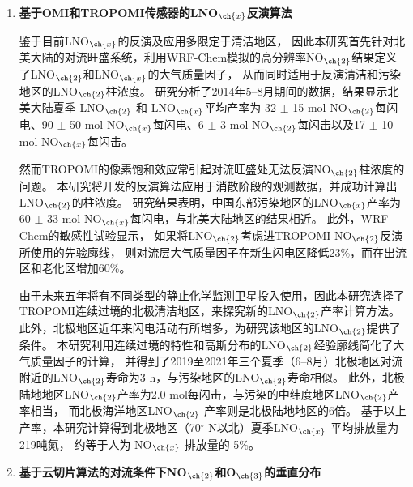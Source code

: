 \begin{enumerate}[label=（\arabic*）, labelindent=\parindent, nosep, leftmargin=0pt, widest=0, itemindent=*, topsep=0pt, partopsep=0pt, parsep=0pt]

\item \textbf{基于OMI和TROPOMI传感器的LNO$_{\ch{x}}$反演算法}

\hspace{4ex} 鉴于目前LNO$_{\ch{x}}$的反演及应用多限定于清洁地区，
因此本研究首先针对北美大陆的对流旺盛系统，利用WRF-Chem模拟的高分辨率NO$_{\ch{2}}$结果定义了LNO$_{\ch{2}}$和LNO$_{\ch{x}}$的大气质量因子，
从而同时适用于反演清洁和污染地区的LNO$_{\ch{2}}$柱浓度。
研究分析了2014年5--8月期间的数据，结果显示北美大陆夏季 LNO$_{\ch{2}}$ 和 LNO$_{\ch{x}}$平均产率为
32 $\pm$ 15 mol NO$_{\ch{2}}$每闪电、90 $\pm$ 50 mol NO$_{\ch{x}}$每闪电、6 $\pm$ 3 mol NO$_{\ch{2}}$每闪击以及17 $\pm$ 10 mol NO$_{\ch{x}}$每闪击。

\hspace{4ex} 然而TROPOMI的像素饱和效应常引起对流旺盛处无法反演NO$_{\ch{2}}$柱浓度的问题。
本研究将开发的反演算法应用于消散阶段的观测数据，并成功计算出LNO$_{\ch{2}}$的柱浓度。
研究结果表明，中国东部污染地区的LNO$_{\ch{x}}$产率为 60 $\pm$ 33 mol NO$_{\ch{x}}$每闪电，与北美大陆地区的结果相近。
此外，WRF-Chem的敏感性试验显示，
如果将LNO$_{\ch{2}}$考虑进TROPOMI NO$_{\ch{2}}$反演所使用的先验廓线，
则对流层大气质量因子在新生闪电区降低23\%，而在出流区和老化区增加60\%。

\hspace{4ex} 由于未来五年将有不同类型的静止化学监测卫星投入使用，因此本研究选择了TROPOMI连续过境的北极清洁地区，来探究新的LNO$_{\ch{2}}$产率计算方法。
此外，北极地区近年来闪电活动有所增多，为研究该地区的LNO$_{\ch{2}}$提供了条件。
本研究利用连续过境的特性和高斯分布的LNO$_{\ch{2}}$经验廓线简化了大气质量因子的计算，%
并得到了2019至2021年三个夏季（6--8月）北极地区对流附近的LNO$_{\ch{2}}$寿命为3 h，与污染地区的LNO$_{\ch{2}}$寿命相似。
此外，北极陆地地区LNO$_{\ch{2}}$产率为2.0 mol每闪击，与污染的中纬度地区LNO$_{\ch{2}}$产率相当，
而北极海洋地区LNO$_{\ch{2}}$ 产率则是北极陆地地区的6倍。
基于以上产率，本研究计算得到北极地区（70$^{\circ}$ N以北）夏季LNO$_{\ch{x}}$ 平均排放量为219吨氮，
约等于人为 NO$_{\ch{x}}$ 排放量的 5\%。

\item \textbf{基于云切片算法的对流条件下NO$_{\ch{2}}$和O$_{\ch{3}}$的垂直分布}


\end{enumerate}
